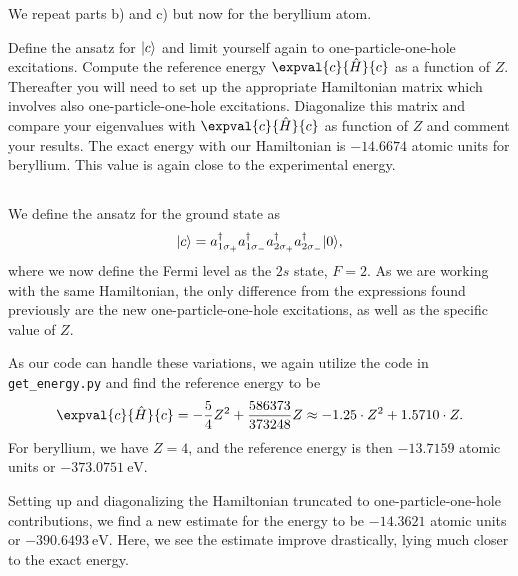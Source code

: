 We repeat parts b) and c) but now for the beryllium atom. %

Define the ansatz for $\lvert c\rangle$ and limit yourself again to one-particle-one-hole excitations.
Compute the reference energy $\expval{c}{\hat{H}}{c}$ as a function of $Z$.
Thereafter you will need to set up the appropriate Hamiltonian matrix which involves also one-particle-one-hole excitations.
Diagonalize this matrix and compare your eigenvalues with $\expval{c}{\hat{H}}{c}$ as function of $Z$ and comment your results.
The exact energy with our Hamiltonian is $-14.6674$ atomic units for beryllium.
This value is again close to the experimental energy.

\subsection{}
We define the ansatz for the ground state as
\begin{equation}
    \lvert c\rangle = a^\dagger_{1\sigma_{+}} a^\dagger_{1\sigma_{-}} a^\dagger_{2\sigma_{+}} a^\dagger_{2\sigma_{-}} \lvert0\rangle,
\end{equation}
where we now define the Fermi level as the $2s$ state, $F = 2$.
As we are working with the same Hamiltonian, the only difference from the expressions found previously are the new one-particle-one-hole excitations, as well as the specific value of $Z$.

As our code can handle these variations, we again utilize the code in \verb|get_energy.py| and find the reference energy to be
\begin{equation}
    \expval{c}{\hat{H}}{c} = -\frac{5}{4} Z^2 + \frac{586373}{373248} Z \approx -1.25 \cdot Z^2 + 1.5710 \cdot Z.
\end{equation}
For beryllium, we have $Z = 4$, and the reference energy is then $-13.7159$ atomic units or $-373.0751 \ \text{eV}$.

Setting up and diagonalizing the Hamiltonian truncated to one-particle-one-hole contributions, we find a new estimate for the energy to be $-14.3621$ atomic units or $-390.6493 \ \text{eV}$.
Here, we see the estimate improve drastically, lying much closer to the exact energy.

